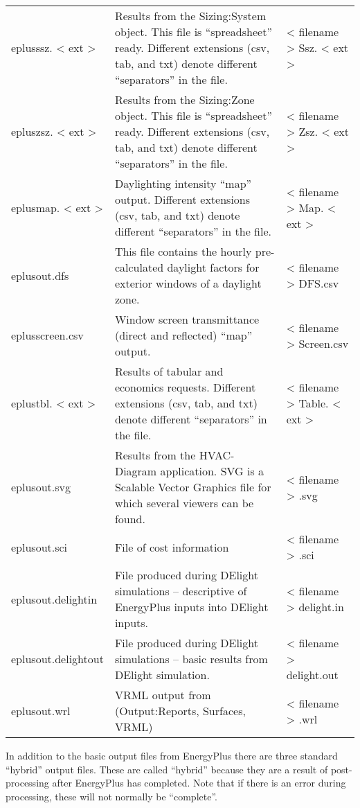 \begin{longtable}[c]{p{1.5in}p{3.0in}p{1.5in}}
eplusssz. < ext > & Results from the Sizing:System object. This file is “spreadsheet” ready. Different extensions (csv, tab, and txt) denote different “separators” in the file. & < filename > Ssz. < ext > \tabularnewline
epluszsz. < ext > & Results from the Sizing:Zone object. This file is “spreadsheet” ready. Different extensions (csv, tab, and txt) denote different “separators” in the file. & < filename > Zsz. < ext > \tabularnewline
eplusmap. < ext > & Daylighting intensity “map” output. Different extensions (csv, tab, and txt) denote different “separators” in the file. & < filename > Map. < ext > \tabularnewline
eplusout.dfs & This file contains the hourly pre-calculated daylight factors for exterior windows of a daylight zone. & < filename > DFS.csv \tabularnewline
eplusscreen.csv & Window screen transmittance (direct and reflected) “map” output. & < filename > Screen.csv \tabularnewline
eplustbl. < ext > & Results of tabular and economics requests. Different extensions (csv, tab, and txt) denote different “separators” in the file. & < filename > Table. < ext > \tabularnewline
eplusout.svg & Results from the HVAC-Diagram application. SVG is a Scalable Vector Graphics file for which several viewers can be found. & < filename > .svg \tabularnewline
eplusout.sci & File of cost information & < filename > .sci \tabularnewline
eplusout.delightin & File produced during DElight simulations – descriptive of EnergyPlus inputs into DElight inputs. & < filename > delight.in \tabularnewline
eplusout.delightout & File produced during DElight simulations – basic results from DElight simulation. & < filename > delight.out \tabularnewline
eplusout.wrl & VRML output from (Output:Reports, Surfaces, VRML) & < filename > .wrl \tabularnewline
\bottomrule
\end{longtable}

In addition to the basic output files from EnergyPlus there are three standard ``hybrid'' output files. These are called ``hybrid'' because they are a result of post-processing after EnergyPlus has completed. Note that if there is an error during processing, these will not normally be ``complete''.

